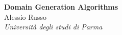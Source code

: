 \documentclass[a4paper,12pt]{article}
\begin{document}
\pagestyle{fancy}
\thispagestyle{empty}
\fancyhead[R]{}
\fancyhead[L]{}
\renewcommand*{\thefootnote}{\fnsymbol{footnote}}
\begin{center}
\Large{\textbf{Domain Generation Algorithms}}
\vspace{0.4cm}
\normalsize
\\ Alessio Russo \\
\vspace{0.1cm}
\textit{Università degli studi di Parma}
\vspace{0.1cm}
\medskip
\normalsize
\end{center}
\begin{multicols}{2}

\end{multicols}
\printbibliography
\end{document}
